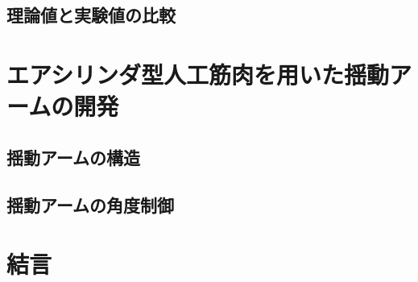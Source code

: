 \subsection{理論値と実験値の比較}%

\section{エアシリンダ型人工筋肉を用いた揺動アームの開発}%
\subsection{揺動アームの構造}
\subsection{揺動アームの角度制御}

\section{結言}%
